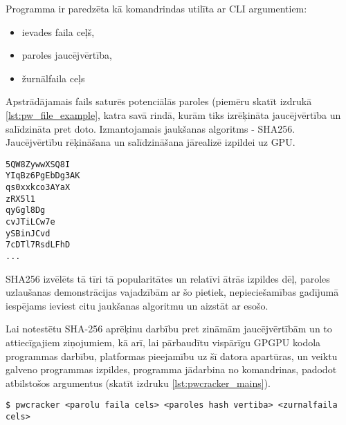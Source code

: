 Programma ir paredzēta kā komandrindas utilīta ar CLI argumentiem:
\begin{itemize}
    \item ievades faila ceļš,
    \item paroles jaucējvērtība,
    \item žurnālfaila ceļs
\end{itemize}

Apstrādājamais fails saturēs potenciālās paroles (piemēru skatīt izdrukā
\ref{lst:pw_file_example}, katra savā rindā, kurām tiks izrēķināta
jaucējvērtība un salīdzināta pret doto. Izmantojamais jaukšanas algoritms -
SHA256. Jaucējvērtību rēķināšana un salīdzināšana jārealizē izpildei uz GPU.
\cite{kursa-darbs}

\begin{lstlisting}[caption={Paroļu ieejas faila piemērs ar nejauši ģenerētām
    parolēm}, captionpos=b, label=lst:pw_file_example]
5QW8ZywwXSQ8I
YIqBz6PgEbDg3AK
qs0xxkco3AYaX
zRX5l1
qyGgl8Dg
cvJTiLCw7e
ySBinJCvd
7cDTl7RsdLFhD
...
\end{lstlisting}

SHA256 izvēlēts tā tīri tā popularitātes un relatīvi ātrās izpildes dēļ,
paroles uzlaušanas demonstrācijas vajadzībām ar šo pietiek, nepieciešamības
gadījumā iespējams ieviest citu jaukšanas algoritmu un aizstāt ar esošo.

Lai notestētu SHA-256 aprēķinu darbību pret zināmām jaucējvērtībām un to
attiecīgajiem ziņojumiem, kā arī, lai pārbaudītu vispārīgu GPGPU kodola
programmas darbību, platformas pieejamību uz šī datora apartūras, un veiktu
galveno programmas izpildes, programma jādarbina no komandrinas, padodot
atbilstošos argumentus (skatīt izdruku  \ref{lst:pwcracker_mains}). \cite{kursa-darbs}

\begin{lstlisting}[caption={Programmas galvenā izpilde}, captionpos=b, 
    label=lst:pwcracker_mains]
$ pwcracker <parolu faila cels> <paroles hash vertiba> <zurnalfaila cels>
\end{lstlisting}

